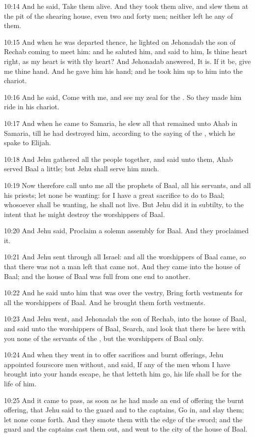 10:14 And he said, Take them alive. And they took them alive, and slew
them at the pit of the shearing house, even two and forty men; neither
left he any of them.

10:15 And when he was departed thence, he lighted on Jehonadab the son
of Rechab coming to meet him: and he saluted him, and said to him, Is
thine heart right, as my heart is with thy heart? And Jehonadab
answered, It is. If it be, give me thine hand. And he gave him his
hand; and he took him up to him into the chariot.

10:16 And he said, Come with me, and see my zeal for the \LORD. So they
made him ride in his chariot.

10:17 And when he came to Samaria, he slew all that remained unto Ahab
in Samaria, till he had destroyed him, according to the saying of the
\LORD, which he spake to Elijah.

10:18 And Jehu gathered all the people together, and said unto them,
Ahab served Baal a little; but Jehu shall serve him much.

10:19 Now therefore call unto me all the prophets of Baal, all his
servants, and all his priests; let none be wanting: for I have a great
sacrifice to do to Baal; whosoever shall be wanting, he shall not
live. But Jehu did it in subtilty, to the intent that he might destroy
the worshippers of Baal.

10:20 And Jehu said, Proclaim a solemn assembly for Baal. And they
proclaimed it.

10:21 And Jehu sent through all Israel: and all the worshippers of
Baal came, so that there was not a man left that came not. And they
came into the house of Baal; and the house of Baal was full from one
end to another.

10:22 And he said unto him that was over the vestry, Bring forth
vestments for all the worshippers of Baal. And he brought them forth
vestments.

10:23 And Jehu went, and Jehonadab the son of Rechab, into the house
of Baal, and said unto the worshippers of Baal, Search, and look that
there be here with you none of the servants of the \LORD, but the
worshippers of Baal only.

10:24 And when they went in to offer sacrifices and burnt offerings,
Jehu appointed fourscore men without, and said, If any of the men whom
I have brought into your hands escape, he that letteth him go, his
life shall be for the life of him.

10:25 And it came to pass, as soon as he had made an end of offering
the burnt offering, that Jehu said to the guard and to the captains,
Go in, and slay them; let none come forth. And they smote them with
the edge of the sword; and the guard and the captains cast them out,
and went to the city of the house of Baal.

